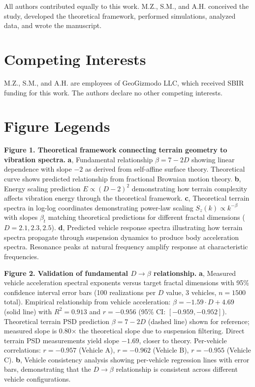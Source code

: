 \documentclass[11pt,letterpaper]{article}
\begin{document}
All authors contributed equally to this work. M.Z., S.M., and A.H. conceived the study, developed the theoretical framework, performed simulations, analyzed data, and wrote the manuscript.

\section*{Competing Interests}

M.Z., S.M., and A.H. are employees of GeoGizmodo LLC, which received SBIR funding for this work. The authors declare no other competing interests.

\section*{Figure Legends}

\textbf{Figure 1. Theoretical framework connecting terrain geometry to vibration spectra.} 
\textbf{a}, Fundamental relationship $\beta = 7-2D$ showing linear dependence with slope $-2$ as derived from self-affine surface theory. Theoretical curve shows predicted relationship from fractional Brownian motion theory. 
\textbf{b}, Energy scaling prediction $E \propto (D-2)^2$ demonstrating how terrain complexity affects vibration energy through the theoretical framework.
\textbf{c}, Theoretical terrain spectra in log-log coordinates demonstrating power-law scaling $S_z(k) \propto k^{-\beta}$ with slopes $\beta_t$ matching theoretical predictions for different fractal dimensions ($D = 2.1, 2.3, 2.5$).
\textbf{d}, Predicted vehicle response spectra illustrating how terrain spectra propagate through suspension dynamics to produce body acceleration spectra. Resonance peaks at natural frequency amplify response at characteristic frequencies.

\textbf{Figure 2. Validation of fundamental $D \rightarrow \beta$ relationship.} 
\textbf{a}, Measured vehicle acceleration spectral exponents versus target fractal dimensions with 95\% confidence interval error bars (100 realizations per $D$ value, 3 vehicles, $n=1500$ total). Empirical relationship from vehicle acceleration: $\beta = -1.59 \cdot D + 4.69$ (solid line) with $R^2 = 0.913$ and $r = -0.956$ (95\% CI: $[-0.959, -0.952]$). Theoretical terrain PSD prediction $\beta = 7-2D$ (dashed line) shown for reference; measured slope is 0.80× the theoretical slope due to suspension filtering. Direct terrain PSD measurements yield slope $-1.69$, closer to theory. Per-vehicle correlations: $r = -0.957$ (Vehicle A), $r = -0.962$ (Vehicle B), $r = -0.955$ (Vehicle C).
\textbf{b}, Vehicle consistency analysis showing per-vehicle regression lines with error bars, demonstrating that the $D \rightarrow \beta$ relationship is consistent across different vehicle configurations.
\end{document}
